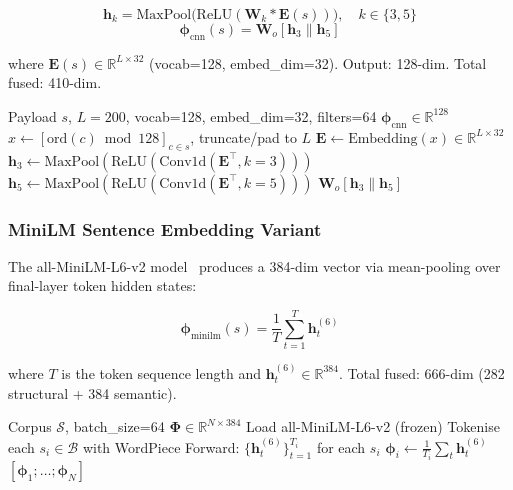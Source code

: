 \documentclass[conference]{IEEEtran}
\begin{document}
\begin{equation}
  \mathbf{h}_k = \text{MaxPool}\bigl(\text{ReLU}(
    \mathbf{W}_k \ast \mathbf{E}(s))\bigr),
  \quad k \in \{3,5\}
  \label{eq:charcnn_conv}
\end{equation}
\begin{equation}
  \boldsymbol{\phi}_{\text{cnn}}(s) = \mathbf{W}_o [\mathbf{h}_3 \| \mathbf{h}_5]
  \label{eq:charcnn_proj}
\end{equation}

where $\mathbf{E}(s) \in \mathbb{R}^{L \times 32}$ (vocab=128, embed\_dim=32).
Output: 128-dim. Total fused: 410-dim.

\begin{algorithm}[t]
\caption{CharCNN Embedding}
\label{alg:charcnn}
\begin{algorithmic}[1]
\REQUIRE Payload $s$, $L{=}200$, vocab=128, embed\_dim=32, filters=64
\ENSURE $\boldsymbol{\phi}_{\text{cnn}} \in \mathbb{R}^{128}$
\STATE $x \leftarrow [\text{ord}(c) \bmod 128]_{c \in s}$, truncate/pad to $L$
\STATE $\mathbf{E} \leftarrow \text{Embedding}(x) \in \mathbb{R}^{L \times 32}$
\STATE $\mathbf{h}_3 \leftarrow \text{MaxPool}(\text{ReLU}(\text{Conv1d}(\mathbf{E}^\top, k{=}3)))$
\STATE $\mathbf{h}_5 \leftarrow \text{MaxPool}(\text{ReLU}(\text{Conv1d}(\mathbf{E}^\top, k{=}5)))$
\RETURN $\mathbf{W}_o [\mathbf{h}_3 \| \mathbf{h}_5]$
\end{algorithmic}
\end{algorithm}

\subsubsection{MiniLM Sentence Embedding Variant}

The all-MiniLM-L6-v2 model~\cite{minilm2020} produces a 384-dim vector via
mean-pooling over final-layer token hidden states:

\begin{equation}
  \boldsymbol{\phi}_{\text{minilm}}(s) =
    \frac{1}{T}\sum_{t=1}^{T} \mathbf{h}_t^{(6)}
  \label{eq:minilm}
\end{equation}

where $T$ is the token sequence length and $\mathbf{h}_t^{(6)} \in \mathbb{R}^{384}$.
Total fused: 666-dim (282 structural + 384 semantic).

\begin{algorithm}[t]
\caption{MiniLM Sentence Embedding}
\label{alg:sentenc}
\begin{algorithmic}[1]
\REQUIRE Corpus $\mathcal{S}$, batch\_size=64
\ENSURE $\boldsymbol{\Phi} \in \mathbb{R}^{N \times 384}$
\STATE Load all-MiniLM-L6-v2 (frozen)
  \STATE Tokenise each $s_i \in \mathcal{B}$ with WordPiece
  \STATE Forward: $\{\mathbf{h}_t^{(6)}\}_{t=1}^{T_i}$ for each $s_i$
  \STATE $\boldsymbol{\phi}_i \leftarrow \frac{1}{T_i}\sum_t \mathbf{h}_t^{(6)}$
\ENDFOR
\RETURN $[\boldsymbol{\phi}_1; \ldots; \boldsymbol{\phi}_N]$
\end{algorithmic}
\end{algorithm}
\end{document}
